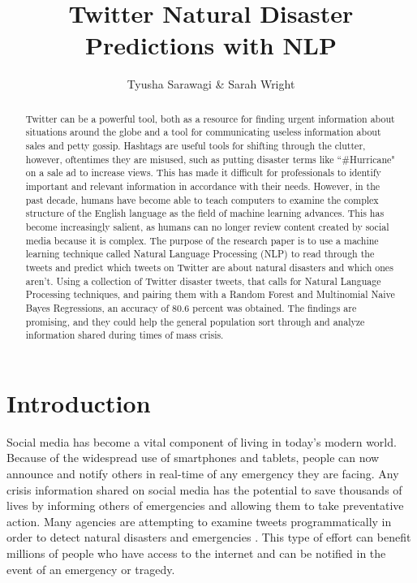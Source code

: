 \documentclass{article}
\title{Twitter Natural Disaster Predictions with NLP}
\author{Tyusha Sarawagi & Sarah Wright}
\begin{document}
\maketitle

\begin{abstract}

Twitter can be a powerful tool, both as a resource for finding urgent information about situations around the globe and a tool for communicating useless information about sales and petty gossip. Hashtags are useful tools for shifting through the clutter, however, oftentimes they are misused, such as putting disaster terms like ``\#Hurricane" on a sale ad to increase views. This has made it difficult for professionals to identify important and relevant information in accordance with their needs. However, in the past decade, humans have become able to teach computers to examine the complex structure of the English language as the field of machine learning advances. This has become increasingly salient, as humans can no longer review  content created by social media because it is complex. The purpose of the research paper is to use a machine learning technique called  Natural Language Processing (NLP) to read through the tweets and  predict which tweets on Twitter are about natural disasters and which ones aren’t. Using a collection of Twitter disaster tweets, that calls for Natural Language Processing techniques, and pairing them with a Random Forest and Multinomial Naive Bayes Regressions, an accuracy of 80.6 percent was obtained. The findings are promising, and they could help the general population sort through and analyze information shared during times of mass crisis. 

\end{abstract}


\section{Introduction}

Social media has become a vital component of living in today's modern world. Because of the widespread use of smartphones and tablets, people can now announce and notify others in real-time of any emergency they are facing. Any crisis information shared on social media has the potential to save thousands of lives by informing others of emergencies and allowing them to take preventative action. Many agencies are attempting to examine tweets programmatically in order to detect natural disasters and emergencies \cite{6}. This type of effort can benefit millions of people who have access to the internet and can be notified in the event of an emergency or tragedy.
\end{document}
